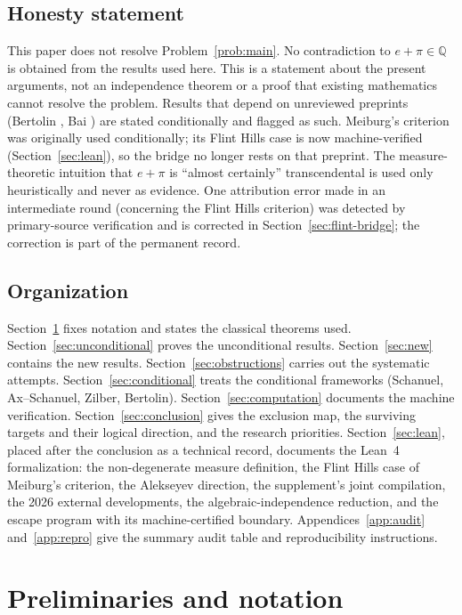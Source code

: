 \documentclass[11pt]{amsart}
\theoremstyle{definition}
\theoremstyle{remark}
\numberwithin{equation}{section}
\newcommand{\Q}{\mathbb{Q}}
\begin{document}
\subsection{Honesty statement} This paper does not resolve Problem~\ref{prob:main}. No contradiction to $e+\pi\in\Q$ is obtained from the results used here. This is a statement about the present arguments, not an independence theorem or a proof that existing mathematics cannot resolve the problem. Results that depend on unreviewed preprints (Bertolin \cite{Bertolin2026}, Bai \cite{Bai2026}) are stated conditionally and flagged as such. Meiburg's criterion \cite{Meiburg2022} was originally used conditionally; its Flint Hills case is now machine-verified (Section~\ref{sec:lean}), so the bridge no longer rests on that preprint. The measure-theoretic intuition that $e+\pi$ is ``almost certainly'' transcendental is used only heuristically and never as evidence. One attribution error made in an intermediate round (concerning the Flint Hills criterion) was detected by primary-source verification and is corrected in Section~\ref{sec:flint-bridge}; the correction is part of the permanent record.

\subsection{Organization} Section~\ref{sec:prelim} fixes notation and states the classical theorems used. Section~\ref{sec:unconditional} proves the unconditional results. Section~\ref{sec:new} contains the new results. Section~\ref{sec:obstructions} carries out the systematic attempts. Section~\ref{sec:conditional} treats the conditional frameworks (Schanuel, Ax--Schanuel, Zilber, Bertolin). Section~\ref{sec:computation} documents the machine verification. Section~\ref{sec:conclusion} gives the exclusion map, the surviving targets and their logical direction, and the research priorities. Section~\ref{sec:lean}, placed after the conclusion as a technical record, documents the Lean~4 formalization: the non-degenerate measure definition, the Flint Hills case of Meiburg's criterion, the Alekseyev direction, the supplement's joint compilation, the 2026 external developments, the algebraic-independence reduction, and the escape program with its machine-certified boundary. Appendices~\ref{app:audit} and~\ref{app:repro} give the summary audit table and reproducibility instructions.

\section{Preliminaries and notation}\label{sec:prelim}
\end{document}
